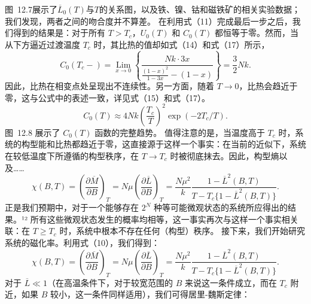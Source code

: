 图~12.7展示了\(\overline{L}_{0}(T)\)与\(T\)的关系图，以及铁、镍、钴和磁铁矿的相关实验数据；我们发现，两者之间的吻合度并不算差。
在利用式（11）完成最后一步之后，我们得到的结果是：对于所有 \(T > T_c\)，\(U_0(T)\) 和 \(C_0(T)\) 都恒等于零。然而，当从下方逼近过渡温度 \(T_c\) 时，其比热的值却如式（14）和式（17）所示，
\begin{equation}\tag{12.5.16}\label{eq:12.5.16}
C _ { 0 } ( T _ { c } - ) = \operatorname* { L i m } _ { x \to 0 } \left\{ \frac { N k \cdot 3 x } { \frac { ( 1 - x ) ^{2} } { 1 - 3 x } - ( 1 - x ) } \right\} = \frac { 3 } { 2 } N k .
\end{equation}
因此，比热在相变点处呈现出不连续性。另一方面，随着 \(T \rightarrow 0\)，比热会趋近于零，这与公式中的表述一致，详见式（15）和式（17）。
\begin{equation}\tag{12.5.17}\label{eq:12.5.17}
C _ { 0 } ( T ) \approx 4 N k \left( \frac { T _ { c } } { T } \right) ^{2} \exp ( - 2 T _ { c } / T ) .
\end{equation}
图~12.8 展示了 \(C_0(T)\) 函数的完整趋势。
值得注意的是，当温度高于 \(T_{c}\) 时，系统的构型能和比热都趋近于零，这直接源于这样一个事实：在当前的近似下，系统在较低温度下所遵循的构型秩序，在 \(T \rightarrow T_{c}\) 时被彻底抹去。因此，构型熵以及\ldots\ldots{}
\begin{equation}\tag{12.5.18}\label{eq:12.5.18}
\chi ( B , T ) = \left( { \frac { \partial { \overline { { M } } } } { \partial B } } \right) _ { T } = N \mu \left( { \frac { \partial { \overline { { L } } } } { \partial B } } \right) _ { T } = { \frac { N \mu ^{2} } { k } } { \frac { 1 - { \overline { { L } } } ^{2} ( B , T ) } { T - T _ { c } \{ 1 - { \overline { { L } } } ^{2} ( B , T ) \} } } .
\end{equation}
正是我们预期中，对于一个能够存在 \(2^{N}\) 种等可能微观状态的系统所应得出的结果。¹² 所有这些微观状态发生的概率均相等，这一事实再次与这样一个事实相关联：在 \(T \geq T_{c}\) 时，系统中根本不存在任何（构型）秩序。
接下来，我们开始研究系统的磁化率。利用式（10），我们得到：
\begin{equation}\tag{12.5.19}\label{eq:12.5.19}
\chi ( B , T ) = \left( { \frac { \partial { \overline { { M } } } } { \partial B } } \right) _ { T } = N \mu \left( { \frac { \partial { \overline { { L } } } } { \partial B } } \right) _ { T } = { \frac { N \mu ^{2} } { k } } { \frac { 1 - { \overline { { L } } } ^{2} ( B , T ) } { T - T _ { c } \{ 1 - { \overline { { L } } } ^{2} ( B , T ) \} } } .
\end{equation}
对于 \(\overline{L} \ll 1\)（在高温条件下，对于较宽范围的 \(B\) 来说这一条件成立，而在 \(T_{c}\) 附近，如果 \(B\) 较小，这一条件同样适用），我们可得居里-魏斯定律：
